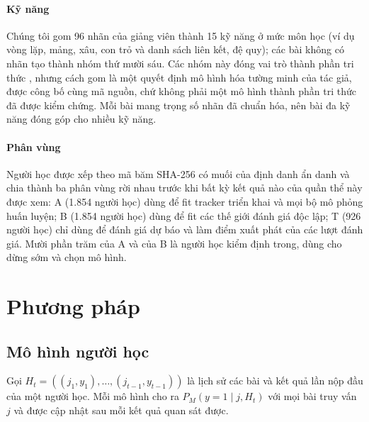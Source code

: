 \documentclass[a4paper,preprint,12pt,authoryear]{elsarticle}
\begin{document}
\paragraph{Kỹ năng} Chúng tôi gom 96 nhãn của giảng viên thành 15 kỹ năng ở mức môn học (ví dụ vòng lặp, mảng, xâu, con trỏ và danh sách liên kết, đệ quy); các bài không có nhãn tạo thành nhóm thứ mười sáu. Các nhóm này đóng vai trò thành phần tri thức \citep{koedinger2012kli}, nhưng cách gom là một quyết định mô hình hóa tường minh của tác giả, được công bố cùng mã nguồn, chứ không phải một mô hình thành phần tri thức đã được kiểm chứng. Mỗi bài mang trọng số nhãn đã chuẩn hóa, nên bài đa kỹ năng đóng góp cho nhiều kỹ năng.

\paragraph{Phân vùng} Người học được xếp theo mã băm SHA-256 có muối của định danh ẩn danh và chia thành ba phân vùng rời nhau trước khi bất kỳ kết quả nào của quần thể này được xem: A (1.854 người học) dùng để fit tracker triển khai và mọi bộ mô phỏng huấn luyện; B (1.854 người học) dùng để fit các thế giới đánh giá độc lập; T (926 người học) chỉ dùng để đánh giá dự báo và làm điểm xuất phát của các lượt đánh giá. Mười phần trăm của A và của B là người học kiểm định trong, dùng cho dừng sớm và chọn mô hình.

\section{Phương pháp}\label{sec:methods}

\subsection{Mô hình người học}\label{sec:learners}

Gọi $H_t=((j_1,y_1),\dots,(j_{t-1},y_{t-1}))$ là lịch sử các bài và kết quả lần nộp đầu của một người học. Mỗi mô hình cho ra $P_M(y=1\mid j,H_t)$ với mọi bài truy vấn $j$ và được cập nhật sau mỗi kết quả quan sát được.
\end{document}
